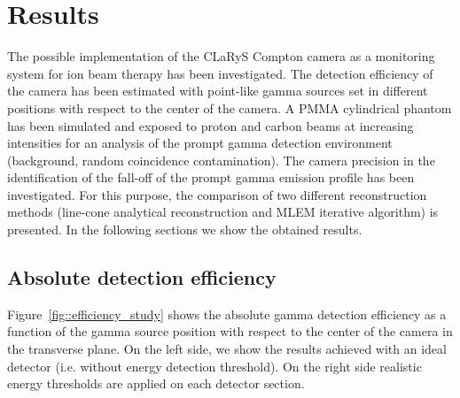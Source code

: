 \section{Results}

The possible implementation of the CLaRyS Compton camera as a monitoring system for ion beam therapy has been investigated. The detection efficiency of the camera has been estimated with point-like gamma sources set in different positions with respect to the center of the camera. A PMMA cylindrical phantom has been simulated and exposed to proton and carbon beams at increasing intensities for an analysis of the prompt gamma detection environment (background, random coincidence contamination). The camera precision in the identification of the fall-off of the prompt gamma emission profile has been investigated. For this purpose, the comparison of two different reconstruction methods (line-cone analytical reconstruction and MLEM iterative algorithm) is presented. In the following sections we show the obtained results. 


\subsection{Absolute detection efficiency}
\label{Results::efficiency}

Figure~\ref{fig::efficiency_study} shows the absolute gamma detection efficiency as a function of the gamma source position with respect to the center of the camera in the transverse plane. On the left side, we show the results achieved with an ideal detector (i.e. without energy detection threshold). On the right side realistic energy thresholds are applied on each detector section.

